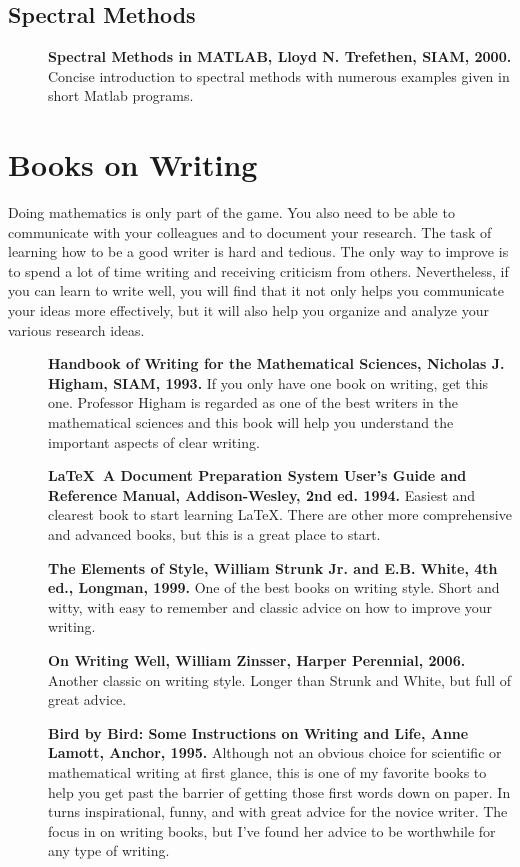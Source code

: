 \documentclass[11pt]{article}
\begin{document}
\subsection{Spectral Methods}
\begin{description}
\item[]{\bf Spectral Methods in MATLAB, Lloyd N. Trefethen, SIAM, 2000.}  Concise introduction to spectral methods with numerous examples given in short Matlab programs.

 \end{description}
 
 
 \section{Books on Writing}
Doing mathematics is only part of the game.  You also need to be able to communicate with your colleagues and to document your research.  The task of learning how to be a good writer is hard and tedious.  The only way to improve is to spend a lot of time writing and receiving criticism from others.  Nevertheless, if you can learn to write well, you will find that it not only helps you communicate your ideas more effectively, but it will also help you organize and analyze your various research ideas. 
  
\begin{description}

\item[ ] {\bf Handbook of Writing for the Mathematical Sciences, Nicholas J. Higham, SIAM, 1993.} If you only have one book on writing, get this one. Professor Higham is regarded as one of the best writers in the mathematical sciences and this book will help you understand the important aspects of clear writing.

\item[ ] {\bf \LaTeX  \ A Document Preparation System User's Guide and Reference Manual, Addison-Wesley, 2nd ed. 1994.} Easiest and clearest book to start learning \LaTeX.  There are other more comprehensive and advanced books, but this is a great place to start.

\item[] {\bf The Elements of Style, William Strunk Jr. and E.B. White, 4th ed., Longman, 1999.} One of the best books on writing style.  Short and witty, with easy to remember and classic advice on how to improve your writing.

\item[] {\bf On Writing Well, William Zinsser, Harper Perennial, 2006.}  Another classic on writing style.   Longer than Strunk and White, but full of great advice.

\item[] {\bf Bird by Bird: Some Instructions on Writing and Life, Anne Lamott, Anchor, 1995.}  Although not an obvious choice for scientific or mathematical writing at first glance, this is one of my favorite books to help you get past the barrier of getting those first words down on paper.  In turns inspirational, funny, and with great advice for the novice writer.  The focus in on writing books, but I've found her advice to be worthwhile for any type of writing.

\end{description}
\end{document}
